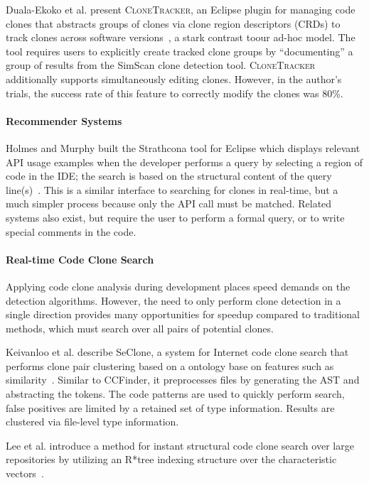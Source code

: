 \documentclass[preprint,10pt]{sigplanconf}
\begin{document}
Duala-Ekoko et al. present \textsc{CloneTracker}, an Eclipse plugin
for managing code clones that abstracts groups of clones via clone
region descriptors (CRDs) to track clones across software
versions~\cite{Duala-Ekoko2007}, a stark contrast toour ad-hoc model.
 The tool requires users to explicitly
create tracked clone groups by ``documenting'' a group of results from
the SimScan clone detection tool. \textsc{CloneTracker} additionally
supports simultaneously editing clones. However, in the author's
trials, the success rate of this feature to correctly modify the
clones was 80\%.

\paragraph{Recommender Systems}

Holmes and Murphy built the Strathcona tool for Eclipse which displays
relevant API usage examples when the developer performs a query by
selecting a region of code in the IDE; the search is based on the
structural content of the query line(s)~\cite{Holmes2005}. 
This is a similar interface to searching for clones in real-time, but a
much simpler process because only the API call must be matched.
Related systems also exist, but require the user to
perform a formal query, or to write special comments in the code.

\paragraph{Real-time Code Clone Search}

Applying code clone analysis during development places speed demands
on the detection algorithms. However, the need to only perform clone
detection in a single direction provides many opportunities for
speedup compared to traditional methods, which must search
over all pairs of potential clones.

Keivanloo et al. describe SeClone, a system for Internet code clone
search that performs clone pair clustering based on a ontology base on
features such as similarity~\cite{Keivanloo2011}. Similar to CCFinder,
it preprocesses files by generating the AST and abstracting the
tokens. The code patterns are used to quickly perform search, false
positives are limited by a retained set of type information. Results
are clustered via file-level type information.

Lee et al. introduce a method for instant structural code clone search
over large repositories by utilizing an R*tree indexing structure over
the characteristic vectors~\cite{Lee2010}.
\end{document}
